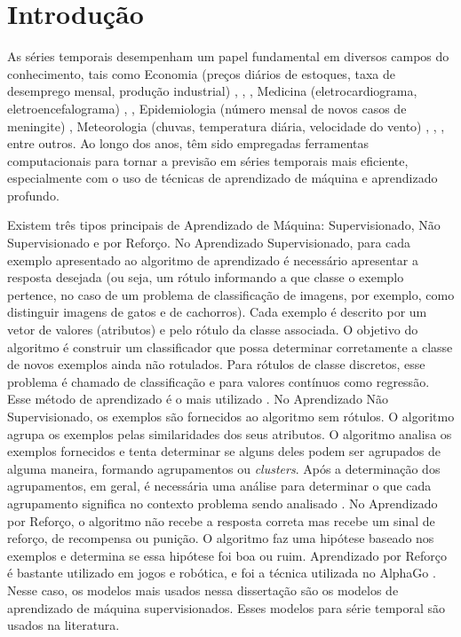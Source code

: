



\section{Introdu{\c c}{\~a}o} \label{sec:int}


As séries temporais desempenham um papel fundamental em diversos campos do conhecimento, tais como Economia (preços diários de estoques, taxa de desemprego mensal, produção industrial) \cite{stock_prices}, \cite{unemployment_rate}, \cite{industrial_production}, Medicina (eletrocardiograma, eletroencefalograma) \cite{ecg}, \cite{eeg}, Epidemiologia (número mensal de novos casos de meningite) \cite{meningitis}, Meteorologia (chuvas, temperatura diária, velocidade do vento) \cite{rainfall}, \cite{temperature}, \cite{wind_speed}, entre outros. Ao longo dos anos, têm sido empregadas ferramentas computacionais para tornar a previsão em séries temporais mais eficiente, especialmente com o uso de técnicas de aprendizado de máquina e aprendizado profundo.

Existem três tipos principais de Aprendizado de Máquina: Supervisionado, Não Supervisionado e por Reforço.
No Aprendizado Supervisionado, para cada exemplo apresentado ao algoritmo de aprendizado é necessário apresentar a resposta desejada (ou seja, um rótulo informando a que classe o exemplo pertence, no caso de um problema de classificação de imagens, por exemplo, como distinguir imagens de gatos e de cachorros). Cada exemplo é descrito por um vetor de valores (atributos) e pelo rótulo da classe associada. O objetivo do algoritmo é construir um classificador que possa determinar corretamente a classe de novos exemplos ainda não rotulados. Para rótulos de classe discretos, esse problema é chamado de classificação e para valores contínuos como regressão. Esse método de aprendizado é o mais utilizado \cite{Silva2021}.
No Aprendizado Não Supervisionado, os exemplos são fornecidos ao algoritmo sem rótulos. O algoritmo agrupa os exemplos pelas similaridades dos seus atributos. O algoritmo analisa os exemplos fornecidos e tenta determinar se alguns deles podem ser agrupados de alguma maneira, formando agrupamentos ou \textit{clusters}. Após a determinação dos agrupamentos, em geral, é necessária uma análise para determinar o que cada agrupamento significa no contexto problema sendo analisado \cite{Silva2021}.
No Aprendizado por Reforço, o algoritmo não recebe a resposta correta mas recebe um sinal de reforço, de recompensa ou punição. O algoritmo faz uma hipótese baseado nos exemplos e determina se essa hipótese foi boa ou ruim. Aprendizado por Reforço é bastante utilizado em jogos e robótica, e foi a técnica utilizada no AlphaGo \cite{Silva2021}. 
Nesse caso, os modelos mais usados nessa dissertação são os modelos de aprendizado de máquina supervisionados. Esses modelos para série temporal são usados na literatura.

